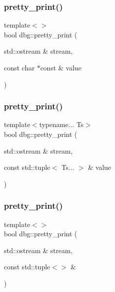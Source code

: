 \mbox{\label{namespacedbg_a17cebbee60948a473318356a59d7f825}} 
\subsubsection{\texorpdfstring{pretty\+\_\+print()}{pretty\_print()}\hspace{0.1cm}{\footnotesize\ttfamily [10/19]}}
{\footnotesize\ttfamily template$<$$>$ \\
bool dbg\+::pretty\+\_\+print (\begin{DoxyParamCaption}\item[{std\+::ostream \&}]{stream,  }\item[{const char $\ast$const \&}]{value }\end{DoxyParamCaption})\hspace{0.3cm}{\ttfamily [inline]}}

\mbox{\label{namespacedbg_a48e38a2e7f91709c4eac1c3ff1532f35}} 
\subsubsection{\texorpdfstring{pretty\+\_\+print()}{pretty\_print()}\hspace{0.1cm}{\footnotesize\ttfamily [11/19]}}
{\footnotesize\ttfamily template$<$typename... Ts$>$ \\
bool dbg\+::pretty\+\_\+print (\begin{DoxyParamCaption}\item[{std\+::ostream \&}]{stream,  }\item[{const std\+::tuple$<$ Ts... $>$ \&}]{value }\end{DoxyParamCaption})\hspace{0.3cm}{\ttfamily [inline]}}

\mbox{\label{namespacedbg_a077f3d4254963a89c600b07eb1b8608b}} 
\subsubsection{\texorpdfstring{pretty\+\_\+print()}{pretty\_print()}\hspace{0.1cm}{\footnotesize\ttfamily [12/19]}}
{\footnotesize\ttfamily template$<$$>$ \\
bool dbg\+::pretty\+\_\+print (\begin{DoxyParamCaption}\item[{std\+::ostream \&}]{stream,  }\item[{const std\+::tuple$<$$>$ \&}]{ }\end{DoxyParamCaption})\hspace{0.3cm}{\ttfamily [inline]}}

